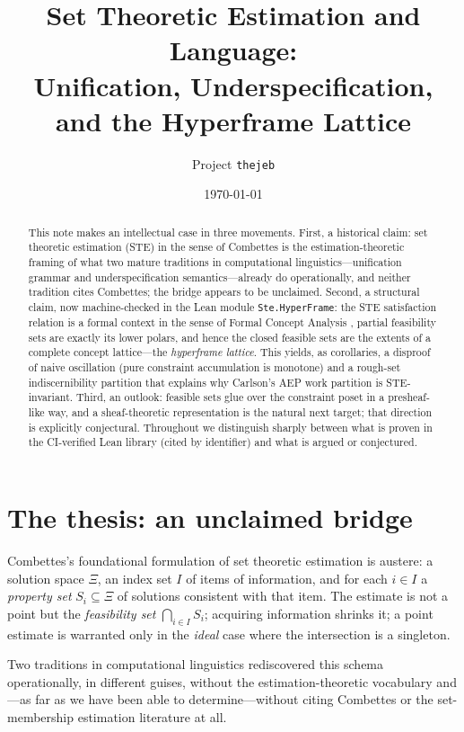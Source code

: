 \documentclass[11pt]{article}
\title{Set Theoretic Estimation and Language:\\
Unification, Underspecification, and the Hyperframe Lattice}
\author{Project \texttt{thejeb}}
\date{\today}
\newcommand{\lean}[1]{\texttt{#1}}
\begin{document}
\maketitle

\begin{abstract}
This note makes an intellectual case in three movements.  First, a
historical claim: set theoretic estimation (STE) in the sense of
Combettes \citep{combettes1993} is the estimation-theoretic framing of
what two mature traditions in computational linguistics---unification
grammar and underspecification semantics---already do operationally, and
neither tradition cites Combettes; the bridge appears to be unclaimed.
Second, a structural claim, now machine-checked in the Lean module
\lean{Ste.HyperFrame}: the STE satisfaction relation is a formal context
in the sense of Formal Concept Analysis \citep{ganter1999fca}, partial
feasibility sets are exactly its lower polars, and hence the closed
feasible sets are the extents of a complete concept lattice---the
\emph{hyperframe lattice}.  This yields, as corollaries, a disproof of
naive oscillation (pure constraint accumulation is monotone) and a
rough-set \citep{pawlak1982rough} indiscernibility partition that
explains why Carlson's AEP work partition \citep{carlson2012} is
STE-invariant.  Third, an outlook: feasible sets glue over the
constraint poset in a presheaf-like way, and a sheaf-theoretic
representation is the natural next target; that direction is explicitly
conjectural.  Throughout we distinguish sharply between what is proven
in the CI-verified Lean library (cited by identifier) and what is
argued or conjectured.
\end{abstract}

\section{The thesis: an unclaimed bridge}

Combettes's foundational formulation of set theoretic estimation
\citep{combettes1993} is austere: a solution space $\Xi$, an index set
$I$ of items of information, and for each $i \in I$ a \emph{property
set} $S_i \subseteq \Xi$ of solutions consistent with that item.  The
estimate is not a point but the \emph{feasibility set}
$\bigcap_{i \in I} S_i$; acquiring information shrinks it; a point
estimate is warranted only in the \emph{ideal} case where the
intersection is a singleton.

Two traditions in computational linguistics rediscovered this schema
operationally, in different guises, without the estimation-theoretic
vocabulary and---as far as we have been able to determine---without
citing Combettes or the set-membership estimation literature at all.
\end{document}
